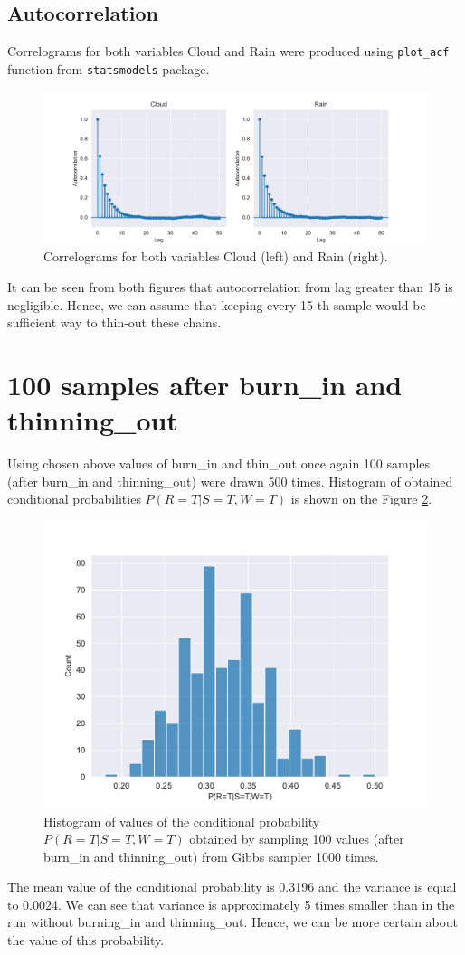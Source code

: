\documentclass[a4paper,11pt]{article}
\begin{document}
\subsection{Autocorrelation}
Correlograms for both variables Cloud and Rain were produced using \texttt{plot\_acf} function from \texttt{statsmodels} package.
\begin{figure}[H]
    \centering
    \includegraphics[scale = 0.7]{Plots/autocorrelation.pdf}
    \caption{Correlograms for both variables Cloud (left) and Rain (right).}
    \label{fig4}
\end{figure}
\noindent It can be seen from both figures that autocorrelation from lag greater than 15 is negligible. Hence, we can assume that keeping every 15-th sample would be  sufficient way to thin-out these chains.
\section{100 samples after burn\_in and thinning\_out}
Using chosen above values of burn\_in and thin\_out once again 100 samples (after burn\_in and thinning\_out) were drawn 500 times. Histogram of obtained conditional probabilities 
$P(R=T|S=T,W=T)$ is shown on the Figure \ref{fig5}.
\begin{figure}[H]
    \centering
    \includegraphics[scale = 0.86]{Plots/histogram100_bt.pdf}
    \caption{Histogram of values of the conditional probability $P(R=T|S=T,W=T)$ obtained by sampling 100 values (after burn\_in and thinning\_out) from Gibbs sampler 1000 times.}
    \label{fig5}
\end{figure}
\noindent The mean value of the conditional probability is 0.3196 and the variance is equal to 0.0024. We can see that variance is approximately 5 times smaller than in the run without burning\_in and thinning\_out. Hence, we can be more certain about the value of this probability.
\end{document}
